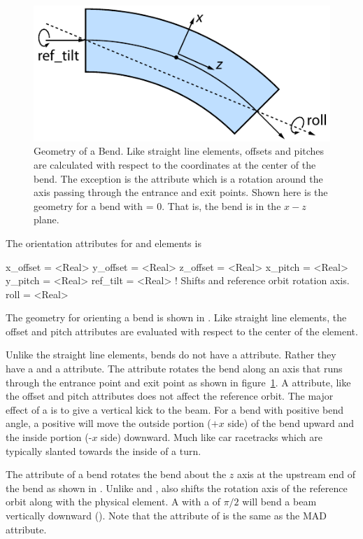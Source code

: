 \begin{figure}[ht]
  \centering
  \includegraphics{roll.pdf}
  \caption[Geometry of a Bend]{
Geometry of a Bend. Like straight line elements, offsets and pitches are calculated with respect to
the coordinates at the center of the bend. The exception is the  attribute which is a
rotation around the axis passing through the entrance and exit points.  Shown here is the geometry
for a bend with  = 0. That is, the bend is in the $x-z$ plane.}
  \label{f:roll}
\end{figure}

The orientation attributes for  and  elements is
\begin{example}
  x_offset = <Real>
  y_offset = <Real>
  z_offset = <Real>
  x_pitch  = <Real>
  y_pitch  = <Real>
  ref_tilt = <Real>    ! Shifts and reference orbit rotation axis.
  roll     = <Real>    
\end{example}
The geometry for orienting a bend is shown in . Like straight line elements, the offset
and pitch attributes are evaluated with respect to the center of the element.

Unlike the straight line elements, bends do not have a  attribute. Rather they have a
 and a  attribute.  The  attribute rotates the bend along an axis
that runs through the entrance point and exit point as shown in figure~\ref{f:roll}. A 
attribute, like the offset and pitch attributes does not affect the reference orbit.  The major
effect of a  is to give a vertical kick to the beam. For a bend with positive bend angle, a
positive  will move the outside portion ($+x$ side) of the bend upward and the inside
portion (-$x$ side) downward. Much like car racetracks which are typically slanted towards the
inside of a turn.

The  attribute of a bend rotates the bend about the $z$ axis at the upstream end of the
bend as shown in . Unlike  and ,  also shifts the
rotation axis of the reference orbit along with the physical element. A  with a
 of $\pi/2$ will bend a beam vertically downward (). Note that the
 attribute of \bmad is the same as the MAD  attribute.

